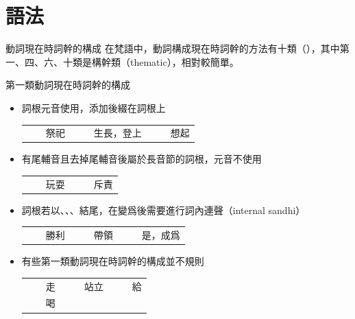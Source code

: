 \documentclass[aspectratio=169]{beamer}
\begin{document}
\section{語法}
\begin{frame}{動詞現在時詞幹的構成}
    \small
    在梵語中，動詞構成現在時詞幹的方法有十類（），其中第一、四、六、十類是構幹類（thematic），相對較簡單。
    \begin{block}{第一類動詞現在時詞幹的構成}
        \begin{itemize}
            \item 詞根元音使用，添加後綴在詞根上\\
                \begin{tabular}{V}
                     &  & 祭祀 
                    &  &  & 生長，登上
                    &  &  & 想起 \\
                \end{tabular}            
            \item 有尾輔音且去掉尾輔音後屬於長音節的詞根，元音不使用\\
                \begin{tabular}{V}
                     &  & 玩耍 &
                     &  & 斥責 \\
                \end{tabular}            
            \item 詞根若以、、、結尾，在變爲後需要進行詞內連聲（internal sandhi）\\
                \begin{tabular}{V}
                     &  & 勝利 &
                     &  & 帶領 &
                     &  & 是，成爲 \\
                \end{tabular}
            \item 有些第一類動詞現在時詞幹的構成並不規則
                \begin{tabular}{V}
                     &  & 走 &
                     &  & 站立 &
                     &  & 給 \\
                     &  & 喝 \\
                \end{tabular}
        \end{itemize}
    \end{block}
\end{frame}
\end{document}
